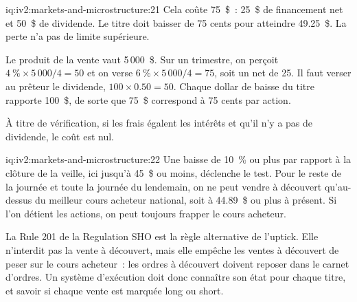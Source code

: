 \begin{solution}{iq:iv2:markets-and-microstructure:21}
Cela coûte 75~\$~: 25~\$ de financement net et 50~\$ de dividende. Le titre doit baisser de 75 cents pour atteindre 49.25~\$. La perte n'a pas de limite supérieure.

Le produit de la vente vaut 5\,000~\$. Sur un trimestre, on perçoit $4~\% \times 5\,000/4 = 50$ et on verse $6~\% \times 5\,000/4 = 75$, soit un net de 25. Il faut verser au prêteur le dividende, $100 \times 0.50 = 50$. Chaque dollar de baisse du titre rapporte 100~\$, de sorte que 75~\$ correspond à 75 cents par action.

À titre de vérification, si les frais égalent les intérêts et qu'il n'y a pas de dividende, le coût est nul.

\end{solution}

\begin{solution}{iq:iv2:markets-and-microstructure:22}
Une baisse de 10~\% ou plus par rapport à la clôture de la veille, ici jusqu'à 45~\$ ou moins, déclenche le test. Pour le reste de la journée et toute la journée du lendemain, on ne peut vendre à découvert qu'au-dessus du meilleur cours acheteur national, soit à 44.89~\$ ou plus à présent. Si l'on détient les actions, on peut toujours frapper le cours acheteur.

La Rule 201 de la Regulation SHO est la règle alternative de l'uptick. Elle n'interdit pas la vente à découvert, mais elle empêche les ventes à découvert de peser sur le cours acheteur~: les ordres à découvert doivent reposer dans le carnet d'ordres. Un système d'exécution doit donc connaître son état pour chaque titre, et savoir si chaque vente est marquée long ou short.

\end{solution}

